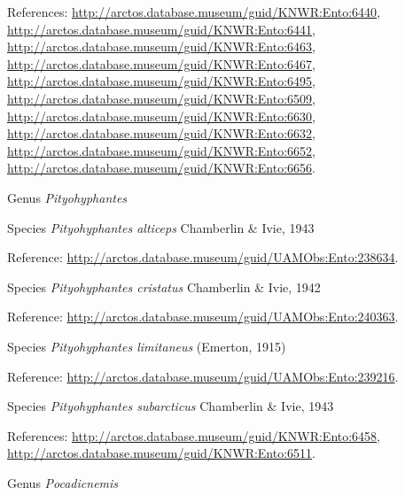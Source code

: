 \documentclass[9pt, article]{memoir}
\begin{document}
\begin{multicols}{2}
\vspace{6pt}References: 
\url{http://arctos.database.museum/guid/KNWR:Ento:6440}, 
\url{http://arctos.database.museum/guid/KNWR:Ento:6441}, 
\url{http://arctos.database.museum/guid/KNWR:Ento:6463}, 
\url{http://arctos.database.museum/guid/KNWR:Ento:6467}, 
\url{http://arctos.database.museum/guid/KNWR:Ento:6495}, 
\url{http://arctos.database.museum/guid/KNWR:Ento:6509}, 
\url{http://arctos.database.museum/guid/KNWR:Ento:6630}, 
\url{http://arctos.database.museum/guid/KNWR:Ento:6632}, 
\url{http://arctos.database.museum/guid/KNWR:Ento:6652}, 
\url{http://arctos.database.museum/guid/KNWR:Ento:6656}.

\vspace{6pt}\noindent\hspace{30pt}Genus \textit{Pityohyphantes}


\vspace{6pt}\noindent\hspace{36pt}Species \textit{Pityohyphantes alticeps} Chamberlin \& Ivie, 1943


\vspace{6pt}Reference: 
\url{http://arctos.database.museum/guid/UAMObs:Ento:238634}.

\vspace{6pt}\noindent\hspace{36pt}Species \textit{Pityohyphantes cristatus} Chamberlin \& Ivie, 1942


\vspace{6pt}Reference: 
\url{http://arctos.database.museum/guid/UAMObs:Ento:240363}.

\vspace{6pt}\noindent\hspace{36pt}Species \textit{Pityohyphantes limitaneus} (Emerton, 1915)


\vspace{6pt}Reference: 
\url{http://arctos.database.museum/guid/UAMObs:Ento:239216}.

\vspace{6pt}\noindent\hspace{36pt}Species \textit{Pityohyphantes subarcticus} Chamberlin \& Ivie, 1943


\vspace{6pt}References: 
\url{http://arctos.database.museum/guid/KNWR:Ento:6458}, 
\url{http://arctos.database.museum/guid/KNWR:Ento:6511}.

\vspace{6pt}\noindent\hspace{30pt}Genus \textit{Pocadicnemis}



\end{multicols}
\end{document}
